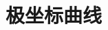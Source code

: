 \documentclass[../main.tex]{subfiles}
\begin{document}
\section{极坐标曲线}

 \hypertarget{tfpo}{}
%
%
%
%
\end{document}
